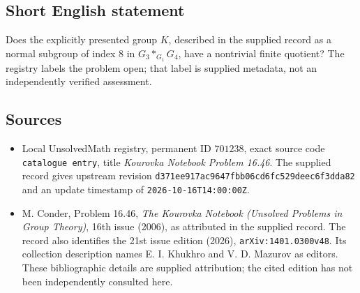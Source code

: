 \documentclass[11pt]{article}
\begin{document}
\subsection{Short English statement}
Does the explicitly presented group \(K\), described in the supplied record as a normal subgroup of index \(8\) in \(G_3*_{G_1}G_4\), have a nontrivial finite quotient? The registry labels the problem open; that label is supplied metadata, not an independently verified assessment.
\subsection{Sources}
\begin{itemize}
\item Local UnsolvedMath registry, permanent ID \(701238\), exact source code \texttt{catalogue entry}, title \emph{Kourovka Notebook Problem 16.46}. The supplied record gives upstream revision \texttt{d371ee917ac9647fbb06cd6fc529deec6f3dda82} and an update timestamp of \texttt{2026-10-16T14:00:00Z}.
\item M. Conder, Problem 16.46, \emph{The Kourovka Notebook (Unsolved Problems in Group Theory)}, 16th issue (2006), as attributed in the supplied record. The record also identifies the 21st issue edition (2026), \texttt{arXiv:1401.0300v48}. Its collection description names E. I. Khukhro and V. D. Mazurov as editors. These bibliographic details are supplied attribution; the cited edition has not been independently consulted here.
\end{itemize}
\end{document}
